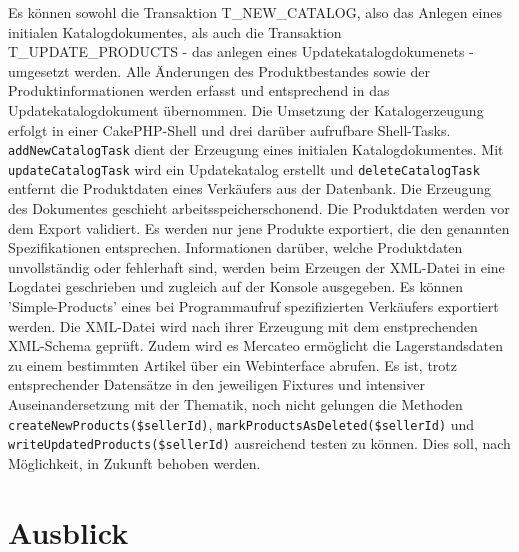	Es können sowohl die Transaktion T\_NEW\_CATALOG, also das Anlegen eines initialen Katalogdokumentes, als auch die Transaktion T\_UPDATE\_PRODUCTS - das anlegen eines Updatekatalogdokumenets - umgesetzt werden. 
	Alle Änderungen des Produktbestandes sowie der Produktinformationen werden erfasst und entsprechend in das Updatekatalogdokument übernommen.
	Die Umsetzung der Katalogerzeugung erfolgt in einer CakePHP-Shell und drei darüber aufrufbare Shell-Tasks. \texttt{addNewCatalogTask} dient der Erzeugung eines initialen Katalogdokumentes. Mit
	\texttt{updateCatalogTask} wird ein Updatekatalog erstellt und \texttt{deleteCatalogTask} entfernt die Produktdaten eines Verkäufers aus der Datenbank.
	Die Erzeugung des Dokumentes geschieht arbeitsspeicherschonend.
	Die Produktdaten werden vor dem Export validiert. Es werden nur jene Produkte exportiert, die den genannten Spezifikationen entsprechen. Informationen darüber, welche Produktdaten unvollständig oder fehlerhaft sind, werden beim Erzeugen der XML-Datei in eine Logdatei geschrieben und zugleich auf der Konsole ausgegeben. Es können 'Simple-Products' eines bei Programmaufruf spezifizierten Verkäufers exportiert werden. Die XML-Datei wird nach ihrer Erzeugung mit dem enstprechenden XML-Schema geprüft. 
	Zudem wird es Mercateo ermöglicht die Lagerstandsdaten zu einem bestimmten Artikel über ein Webinterface abrufen. 
	Es ist, trotz entsprechender Datensätze in den jeweiligen Fixtures und intensiver Auseinandersetzung mit der Thematik, noch nicht gelungen die Methoden \texttt{createNewProducts(\$sellerId)}, \texttt{markProductsAsDeleted(\$sellerId)} und \texttt{writeUpdatedProducts(\$sellerId)} ausreichend testen zu können. Dies soll, nach Möglichkeit, in Zukunft behoben werden.
	
	
	\section{Ausblick}
	
	
	
	
	\pagebreak
	\setcounter{page}{1}
	\begin{appendix}
	\pagebreak
		\listoffigures
		\pagebreak
		\listoftables
		\pagebreak
		\lstlistoflistings
	\end{appendix}
	
	
	
	

	

